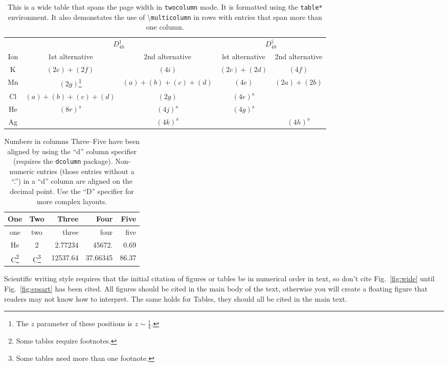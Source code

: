 \documentclass[aps,prl,twocolumn,superscriptaddress,groupedaddress]{revtex4}  %
\begin{document}
\begin{table}
\caption{\label{tab:table3}This is a wide table that spans the page
width in \texttt{twocolumn} mode. It is formatted using the
\texttt{table*} environment. It also demonstates the use of
\textbackslash\texttt{multicolumn} in rows with entries that span
more than one column.}
\begin{ruledtabular}
\begin{tabular}{ccccc}
 &\multicolumn{2}{c}{$D_{4h}^1$}&\multicolumn{2}{c}{$D_{4h}^5$}\\
 Ion&1st alternative&2nd alternative&lst alternative
&2nd alternative\\ \hline
 K&$(2e)+(2f)$&$(4i)$ &$(2c)+(2d)$&$(4f)$ \\
 Mn&$(2g)$\footnote{The $z$ parameter of these positions is $z\sim\frac{1}{4}$.}
 &$(a)+(b)+(c)+(d)$&$(4e)$&$(2a)+(2b)$\\
 Cl&$(a)+(b)+(c)+(d)$&$(2g)$\footnotemark[1]
 &$(4e)^{\text{a}}$\\
 He&$(8r)^{\text{a}}$&$(4j)^{\text{a}}$&$(4g)^{\text{a}}$\\
 Ag& &$(4k)^{\text{a}}$& &$(4h)^{\text{a}}$\\
\end{tabular}
\end{ruledtabular}
\end{table}

\begin{table}
\caption{\label{tab:table4}Numbers in columns Three--Five have been
aligned by using the ``d'' column specifier (requires the
\texttt{dcolumn} package). Non-numeric entries (those entries without
a ``.'') in a ``d'' column are aligned on the decimal point. Use the
``D'' specifier for more complex layouts. }
\begin{ruledtabular}
\begin{tabular}{ccddd}
One&Two&\mbox{Three}&\mbox{Four}&\mbox{Five}\\
\hline
one&two&\mbox{three}&\mbox{four}&\mbox{five}\\
He&2& 2.77234 & 45672. & 0.69 \\
C\footnote{Some tables require footnotes.}
  &C\footnote{Some tables need more than one footnote.}
  & 12537.64 & 37.66345 & 86.37 \\
\end{tabular}
\end{ruledtabular}
\end{table}



Scientific writing style requires that the initial citation of
figures or tables be in numerical order in text, so don't cite
Fig.~\ref{fig:wide} until Fig.~\ref{fig:epsart} has been cited.
All figures should be cited in the main body of the text, otherwise
you will create a floating figure that readers may not know how to interpret.
The same holds for Tables, they should all be cited in the main text.
\end{document}
